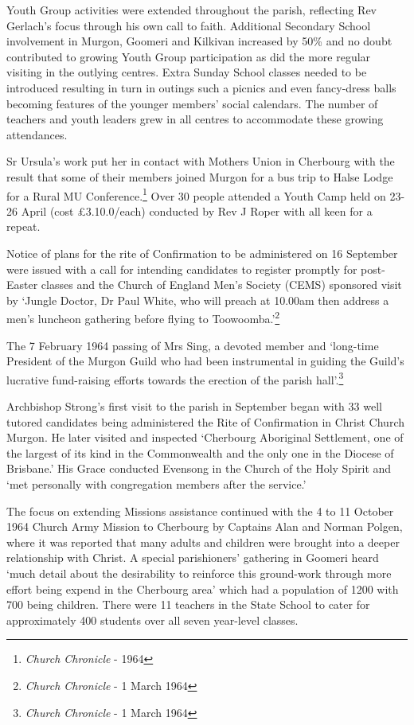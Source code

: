Youth Group activities were extended throughout the parish, reflecting
Rev Gerlach's focus through his own call to faith. Additional Secondary
School involvement in Murgon, Goomeri and Kilkivan increased by 50\% and
no doubt contributed to growing Youth Group participation as did the
more regular visiting in the outlying centres. Extra Sunday School
classes needed to be introduced resulting in turn in outings such a
picnics and even fancy-dress balls becoming features of the younger
members' social calendars. The number of teachers and youth leaders grew
in all centres to accommodate these growing attendances.

Sr Ursula's work put her in contact with Mothers Union in Cherbourg with
the result that some of their members joined Murgon for a bus trip to
Halse Lodge for a Rural MU Conference.\footnote{\emph{Church Chronicle}
  - 1964} Over 30 people attended a Youth Camp held on 23-26 April (cost
£3.10.0/each) conducted by Rev J Roper with all keen for a repeat.

Notice of plans for the rite of Confirmation to be administered on 16
September were issued with a call for intending candidates to register
promptly for post-Easter classes and the Church of England Men's Society
(CEMS) sponsored visit by `Jungle Doctor, Dr Paul White, who will preach
at 10.00am then address a men's luncheon gathering before flying to
Toowoomba.'\footnote{\emph{Church Chronicle} - 1 March 1964}

The 7 February 1964 passing of Mrs Sing, a devoted member and `long-time
President of the Murgon Guild who had been instrumental in guiding the
Guild's lucrative fund-raising efforts towards the erection of the
parish hall'.\footnote{\emph{Church Chronicle} - 1 March 1964}

Archbishop Strong's first visit to the parish in September began with 33
well tutored candidates being administered the Rite of Confirmation in
Christ Church Murgon. He later visited and inspected `Cherbourg
Aboriginal Settlement, one of the largest of its kind in the
Commonwealth and the only one in the Diocese of Brisbane.' His Grace
conducted Evensong in the Church of the Holy Spirit and `met personally
with congregation members after the service.'

The focus on extending Missions assistance continued with the 4 to 11
October 1964 Church Army Mission to Cherbourg by Captains Alan and
Norman Polgen, where it was reported that many adults and children were
brought into a deeper relationship with Christ. A special parishioners'
gathering in Goomeri heard `much detail about the desirability to
reinforce this ground-work through more effort being expend in the
Cherbourg area' which had a population of 1200 with 700 being children.
There were 11 teachers in the State School to cater for approximately
400 students over all seven year-level classes.

